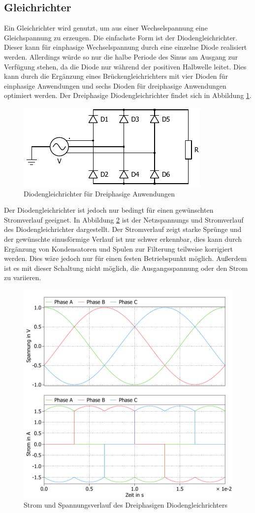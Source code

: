 		\subsection{Gleichrichter}
		\label{sec:Rec}
		Ein Gleichrichter wird genutzt, um aus einer Wechselspannung eine Gleichspannung zu erzeugen. Die einfachste Form ist der Diodengleichrichter. Dieser kann für einphasige Wechselspannung durch eine einzelne Diode realisiert werden. Allerdings würde so nur die halbe Periode des Sinus am Ausgang zur Verfügung stehen, da die Diode nur während der positiven Halbwelle leitet. Dies kann durch die Ergänzung eines Brückengleichrichters mit vier Dioden für einphasige Anwendungen und sechs Dioden für dreiphasige Anwendungen optimiert werden. Der Dreiphasige Diodengleichrichter findet sich in Abbildung \ref{fig:B6DiodRect}. 
		\begin{figure}[H]
			\centering
			\includegraphics[width=0.8\linewidth]{content/Grafiken/Plecs_Diodengleichrichter.pdf}
			\caption{Diodengleichrichter für Dreiphasige Anwendungen}
			\label{fig:B6DiodRect}
		\end{figure}
		Der Diodengleichrichter ist jedoch nur bedingt für einen gewünschten Stromverlauf geeignet. In Abbildung \ref{fig:B6DiodRectI} ist der Netzspannungs und Stromverlauf des Diodengleichrichter dargestellt. Der Stromverlauf zeigt starke Sprünge und der gewünschte sinusförmige Verlauf ist nur schwer erkennbar, dies kann durch Ergänzung von Kondensatoren und Spulen zur Filterung teilweise korrigiert werden. Dies wäre jedoch nur für einen festen Betriebspunkt möglich. Außerdem ist es mit dieser Schaltung nicht möglich, die Ausgangsspannung oder den Strom zu variieren.
		\begin{figure}
			\centering
			\includegraphics[width=0.68\linewidth]{content/Grafiken/B6-Diodengleichrichter-Eingangsverlauf}
			\caption{Strom und Spannungsverlauf des Dreiphasigen Diodengleichrichters }
			\label{fig:B6DiodRectI}
		\end{figure}
